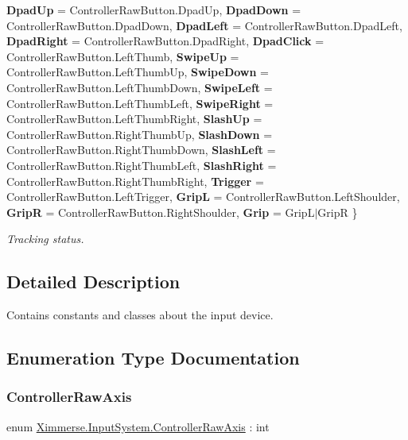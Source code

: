 \begin{DoxyCompactItemize}
{\bfseries Dpad\+Up} = Controller\+Raw\+Button.\+Dpad\+Up, 
{\bfseries Dpad\+Down} = Controller\+Raw\+Button.\+Dpad\+Down, 
{\bfseries Dpad\+Left} = Controller\+Raw\+Button.\+Dpad\+Left, 
{\bfseries Dpad\+Right} = Controller\+Raw\+Button.\+Dpad\+Right, 
\newline
{\bfseries Dpad\+Click} = Controller\+Raw\+Button.\+Left\+Thumb, 
{\bfseries Swipe\+Up} = Controller\+Raw\+Button.\+Left\+Thumb\+Up, 
{\bfseries Swipe\+Down} = Controller\+Raw\+Button.\+Left\+Thumb\+Down, 
{\bfseries Swipe\+Left} = Controller\+Raw\+Button.\+Left\+Thumb\+Left, 
\newline
{\bfseries Swipe\+Right} = Controller\+Raw\+Button.\+Left\+Thumb\+Right, 
{\bfseries Slash\+Up} = Controller\+Raw\+Button.\+Right\+Thumb\+Up, 
{\bfseries Slash\+Down} = Controller\+Raw\+Button.\+Right\+Thumb\+Down, 
{\bfseries Slash\+Left} = Controller\+Raw\+Button.\+Right\+Thumb\+Left, 
\newline
{\bfseries Slash\+Right} = Controller\+Raw\+Button.\+Right\+Thumb\+Right, 
{\bfseries Trigger} = Controller\+Raw\+Button.\+Left\+Trigger, 
{\bfseries GripL} = Controller\+Raw\+Button.\+Left\+Shoulder, 
{\bfseries GripR} = Controller\+Raw\+Button.\+Right\+Shoulder, 
\newline
{\bfseries Grip} = Grip\+L$\vert$\+GripR
 \}
\begin{DoxyCompactList}\small\item\em Tracking status. \end{DoxyCompactList}\end{DoxyCompactItemize}


\subsection{Detailed Description}
Contains constants and classes about the input device. 

\subsection{Enumeration Type Documentation}
\mbox{\label{namespace_ximmerse_1_1_input_system_a0c8e8c63a915b6a1d6f88ef3c88223a4}} 
\subsubsection{\texorpdfstring{Controller\+Raw\+Axis}{ControllerRawAxis}}
{\footnotesize\ttfamily enum \mbox{\hyperlink{namespace_ximmerse_1_1_input_system_a0c8e8c63a915b6a1d6f88ef3c88223a4}{Ximmerse.\+Input\+System.\+Controller\+Raw\+Axis}} \+: int\hspace{0.3cm}{\ttfamily [strong]}}




